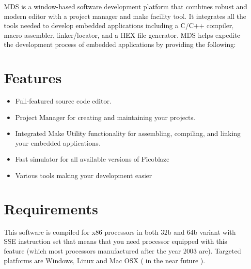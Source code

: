 MDS is a window-based software development platform that combines robust and modern editor with a project manager and make facility tool. It integrates all the tools needed to develop embedded applications including a C/C++ compiler, macro assembler, linker/locator, and a HEX file generator. MDS helps expedite the development process of embedded applications by providing the following:

\section{Features}
    \begin{itemize}
        \item Full-featured source code editor.
        \item Project Manager for creating and maintaining your projects.
        \item Integrated Make Utility functionality for assembling, compiling, and linking your embedded applications.
        \item Fast simulator for all available versions of Picoblaze
        \item Various tools making your development easier
    \end{itemize}

\section{Requirements}
    This software is compiled for x86 processors in both 32b and 64b variant with SSE instruction set
    that means that you need processor equipped with this feature (which most processors manufactured after the year 2003 are).
    Targeted platforms are Windows, Linux and Mac OSX ( in the near future ).